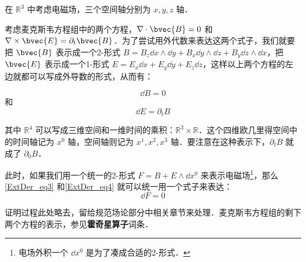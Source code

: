 

在 $\mathbb{R}^3$ 中考虑电磁场，三个空间轴分别为 $x, y, z$ 轴．

考虑麦克斯韦方程组中的两个方程，$\nabla\cdot\bvec{B}=0$ 和 $\nabla\times\bvec{E}=\partial_t\bvec{B}$．为了尝试用外代数来表达这两个式子，我们就要把 $\bvec{B}$
表示成一个2-形式 $B=B_z\dd x\wedge\dd y+B_x\dd y\wedge\dd z+B_y\dd z\wedge\dd x$，把 $\bvec{E}$ 表示成一个1-形式 $E=E_x\dd x+E_y\dd y+E_z\dd z$，这样以上两个方程的左边就都可以写成外导数的形式，从而有：

\begin{equation}\label{ExtDer_eq3}
\dd B=0
\end{equation}
和
\begin{equation}\label{ExtDer_eq4}
\dd E=\partial_tB
\end{equation}

其中 $\mathbb{R}^4$ 可以写成三维空间和一维时间的乘积：$\mathbb{R}^3\times\mathbb{R}$．这个四维欧几里得空间中的时间轴记为 $x^0$ 轴，空间轴则记为 $x^1, x^2, x^3$ 轴．要注意在这种表示下，$\partial_tB$ 就成了 $\partial_0B$．

此时，如果我们用一个统一的2-形式 $F=B+E\wedge\dd x^0$ 来表示电磁场\footnote{电场外积一个 $\dd x^0$ 是为了凑成合适的2-形式．}，那么\autoref{ExtDer_eq3} 和\autoref{ExtDer_eq4} 就可以统一用一个式子来表达：
\begin{equation}
\dd F=0
\end{equation}

证明过程此处略去，留给规范场论部分中相关章节来处理．麦克斯韦方程组的剩下两个方程的表示，参见\textbf{霍奇星算子}词条．


